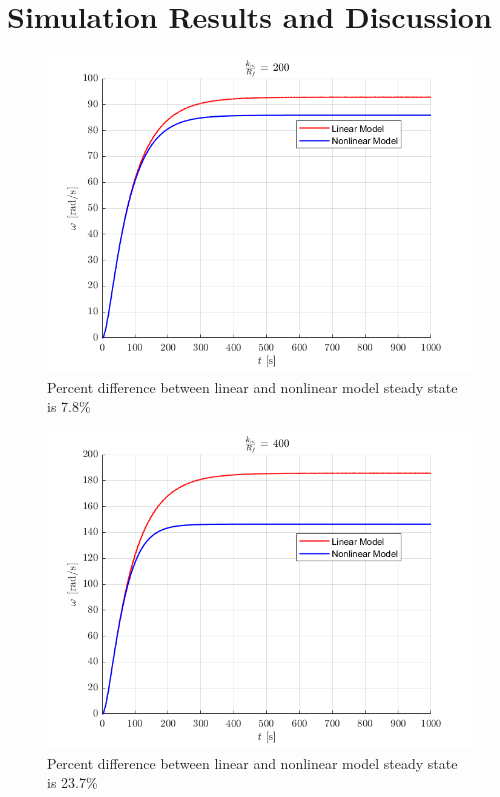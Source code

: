 \documentclass[letterpaper,12pt]{article}
\begin{document}
\section{Simulation Results and Discussion}
\begin{figure}[h!]
    \centering
    \includegraphics[scale = .5]{a200.png}
    \caption{Percent difference between linear and nonlinear model steady state is 7.8\%}
    \label{alpha200}
\end{figure}

\begin{figure}[h!]
    \centering
    \includegraphics[scale = .5]{a400.png}
    \caption{Percent difference between linear and nonlinear model steady state is 23.7\%}
    \label{alpha400}
\end{figure}
\end{document}
